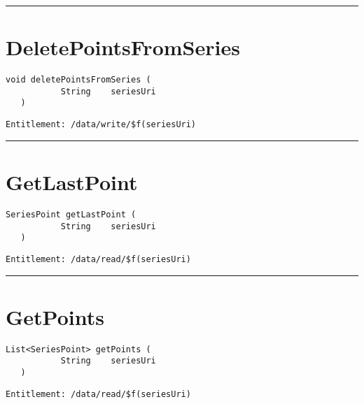 \rule{12cm}{2pt}
\section{DeletePointsFromSeries}
\label{Api:DeletePointsFromSeries}
\begin{lstlisting}[style=nonumbers]
   void deletePointsFromSeries (
           String    seriesUri
   )
\end{lstlisting}
\begin{Verbatim}[formatcom=\color{Maroon}]
  Entitlement: /data/write/$f(seriesUri)
\end{Verbatim}



\rule{12cm}{2pt}
\section{GetLastPoint}
\label{Api:GetLastPoint}
\begin{lstlisting}[style=nonumbers]
   SeriesPoint getLastPoint (
           String    seriesUri
   )
\end{lstlisting}
\begin{Verbatim}[formatcom=\color{Maroon}]
  Entitlement: /data/read/$f(seriesUri)
\end{Verbatim}



\rule{12cm}{2pt}
\section{GetPoints}
\label{Api:GetPoints}
\begin{lstlisting}[style=nonumbers]
   List<SeriesPoint> getPoints (
           String    seriesUri
   )
\end{lstlisting}
\begin{Verbatim}[formatcom=\color{Maroon}]
  Entitlement: /data/read/$f(seriesUri)
\end{Verbatim}



